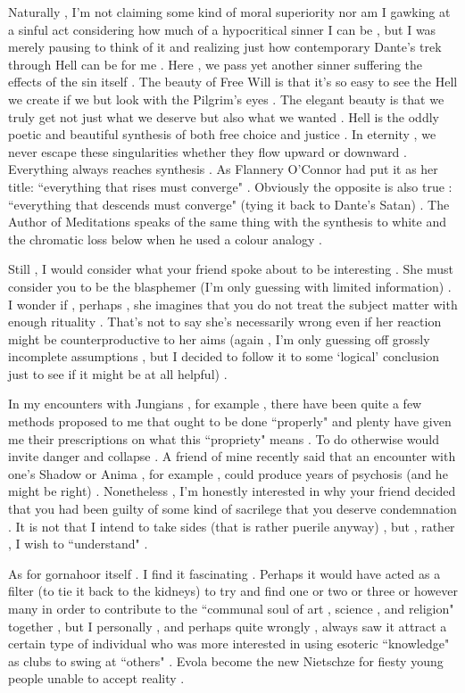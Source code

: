 \begin{footnotesize}
\begin{sffamily}
Naturally , I'm not claiming some kind of moral superiority nor am I gawking at a sinful act considering how much of a hypocritical sinner I can be , but I was merely pausing to think of it and realizing just how contemporary Dante's trek through Hell can be for me . Here , we pass yet another sinner suffering the effects of the sin itself . The beauty of Free Will is that it's so easy to see the Hell we create if we but look with the Pilgrim's eyes . The elegant beauty is that we truly get not just what we deserve but also what we wanted . Hell is the oddly poetic and beautiful synthesis of both free choice and justice . In eternity , we never escape these singularities whether they flow upward or downward . Everything always reaches synthesis . As Flannery O'Connor had put it as her title: ``everything that rises must converge" . Obviously the opposite is also true : ``everything that descends must converge" (tying it back to Dante's Satan) . The Author of Meditations speaks of the same thing with the synthesis to white and the chromatic loss below when he used a colour analogy .

Still , I would consider what your friend spoke about to be interesting . She must consider you to be the blasphemer (I'm only guessing with limited information) . I wonder if , perhaps , she imagines that you do not treat the subject matter with enough rituality . That's not to say she's necessarily wrong even if her reaction might be counterproductive to her aims (again , I'm only guessing off grossly incomplete assumptions , but I decided to follow it to some `logical' conclusion just to see if it might be at all helpful) .

In my encounters with Jungians , for example , there have been quite a few methods proposed to me that ought to be done ``properly" and plenty have given me their prescriptions on what this ``propriety" means . To do otherwise would invite danger and collapse . A friend of mine recently said that an encounter with one's Shadow or Anima , for example , could produce years of psychosis (and he might be right) . Nonetheless , I'm honestly interested in why your friend decided that you had been guilty of some kind of sacrilege that you deserve condemnation . It is not that I intend to take sides (that is rather puerile anyway) , but , rather , I wish to ``understand" .

As for gornahoor itself . I find it fascinating . Perhaps it would have acted as a filter (to tie it back to the kidneys) to try and find one or two or three or however many in order to contribute to the ``communal soul of art , science , and religion" together , but I personally , and perhaps quite wrongly , always saw it attract a certain type of individual who was more interested in using esoteric ``knowledge" as clubs to swing at ``others" . Evola become the new Nietschze for fiesty young people unable to accept reality .


\end{sffamily}
\end{footnotesize}
